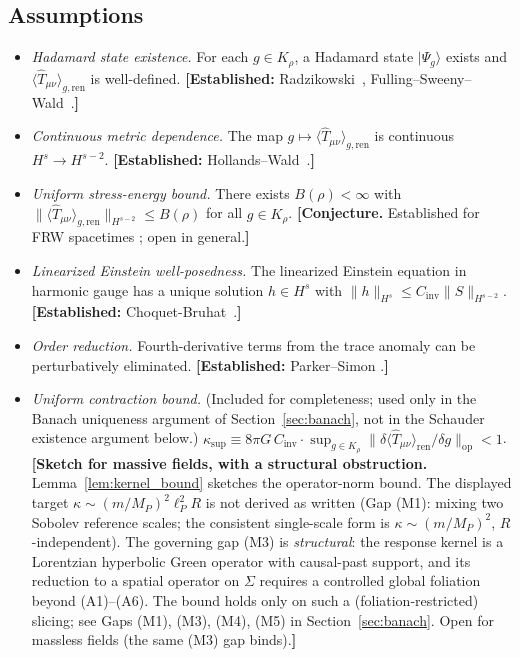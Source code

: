 \documentclass[12pt,a4paper]{article}
\begin{document}
\subsection{Assumptions}

\begin{itemize}
\item[\textbf{(A1)}] \textit{Hadamard state existence.} For each $g\in K_\rho$, a
Hadamard state $|\Psi_g\rangle$ exists and $\langle\hat{T}_{\mu\nu}\rangle_{g,\text{ren}}$
is well-defined. \textbf{[Established:} Radzikowski~\cite{radzikowski},
Fulling--Sweeny--Wald~\cite{fulling_sweeny_wald}.\textbf{]}

\item[\textbf{(A2)}] \textit{Continuous metric dependence.} The map $g\mapsto
\langle\hat{T}_{\mu\nu}\rangle_{g,\text{ren}}$ is continuous $H^s\to H^{s-2}$.
\textbf{[Established:} Hollands--Wald~\cite{hollands_wald_wick}.\textbf{]}

\item[\textbf{(A3)}] \textit{Uniform stress-energy bound.} There exists $B(\rho)<\infty$
with $\|\langle\hat{T}_{\mu\nu}\rangle_{g,\text{ren}}\|_{H^{s-2}} \leq B(\rho)$ for all
$g\in K_\rho$. \textbf{[Conjecture.} Established for FRW spacetimes
\cite{pinamonti_siemssen}; open in general.\textbf{]}

\item[\textbf{(A4)}] \textit{Linearized Einstein well-posedness.} The linearized Einstein
equation in harmonic gauge has a unique solution $h\in H^s$ with
$\|h\|_{H^s} \leq C_{\text{inv}}\|S\|_{H^{s-2}}$.
\textbf{[Established:} Choquet-Bruhat~\cite{choquet_bruhat}.\textbf{]}

\item[\textbf{(A5)}] \textit{Order reduction.} Fourth-derivative terms from the trace
anomaly can be perturbatively eliminated. \textbf{[Established:} Parker--Simon
\cite{parker_simon}.\textbf{]}

\item[\textbf{(A6)}] \textit{Uniform contraction bound.}
(Included for completeness; used only in the Banach uniqueness argument of Section~\ref{sec:banach}, not in the Schauder existence argument below.)\newline
$\kappa_{\sup} \equiv 8\pi G\,C_{\text{inv}}\cdot\sup_{g\in K_\rho}\|\delta\langle\hat{T}_{\mu\nu}\rangle_{\text{ren}}/\delta g\|_{\text{op}} < 1$.
\textbf{[Sketch for massive fields, with a structural obstruction.}
Lemma~\ref{lem:kernel_bound} sketches the operator-norm bound. The displayed target
$\kappa \sim (m/M_P)^2\ell_P^2 R$ is not derived as written (Gap (M1): mixing two Sobolev
reference scales; the consistent single-scale form is $\kappa\sim(m/M_P)^2$, $R$-independent).
The governing gap (M3) is \emph{structural}: the response kernel is a Lorentzian hyperbolic
Green operator with causal-past support, and its reduction to a spatial operator on
$\Sigma$ requires a controlled global foliation beyond (A1)--(A6). The bound holds only on
such a (foliation-restricted) slicing; see Gaps (M1), (M3), (M4), (M5) in
Section~\ref{sec:banach}. Open for massless fields (the same (M3) gap binds).\textbf{]}
\end{itemize}
\end{document}

